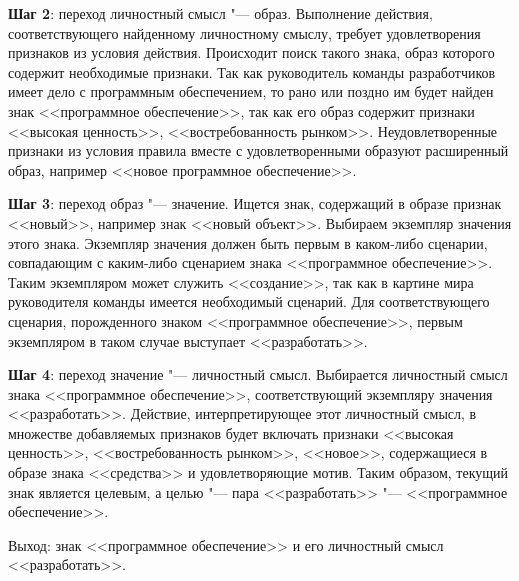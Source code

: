 \textbf{Шаг 2}: переход личностный смысл "--- образ. Выполнение действия, соответствующего найденному личностному смыслу, требует удовлетворения признаков из условия действия. Происходит поиск такого знака, образ которого содержит необходимые признаки. Так как руководитель команды разработчиков имеет дело с программным обеспечением, то рано или поздно им будет найден знак <<программное обеспечение>>, так как его образ содержит признаки <<высокая ценность>>, <<востребованность рынком>>. Неудовлетворенные признаки из условия правила вместе с удовлетворенными образуют расширенный образ, например <<новое программное обеспечение>>.

\textbf{Шаг 3}: переход образ "--- значение. Ищется знак, содержащий в образе признак <<новый>>, например знак <<новый объект>>. Выбираем экземпляр значения этого знака. Экземпляр значения должен быть первым в каком-либо сценарии, совпадающим с каким-либо сценарием знака <<программное обеспечение>>. Таким экземпляром может служить <<создание>>, так как в картине мира руководителя команды имеется необходимый сценарий. Для соответствующего сценария, порожденного знаком <<программное обеспечение>>, первым экземпляром в таком случае выступает <<разработать>>.

\textbf{Шаг 4}: переход значение "--- личностный смысл. Выбирается личностный смысл знака <<программное обеспечение>>, соответствующий экземпляру значения <<разработать>>. Действие, интерпретирующее этот личностный смысл, в множестве добавляемых признаков будет включать признаки <<высокая ценность>>, <<востребованность рынком>>, <<новое>>, содержащиеся в образе знака <<средства>> и удовлетворяющие мотив. Таким образом, текущий знак является целевым, а целью "--- пара <<разработать>> "--- <<программное обеспечение>>.

Выход: знак <<программное обеспечение>> и его личностный смысл <<разработать>>.
